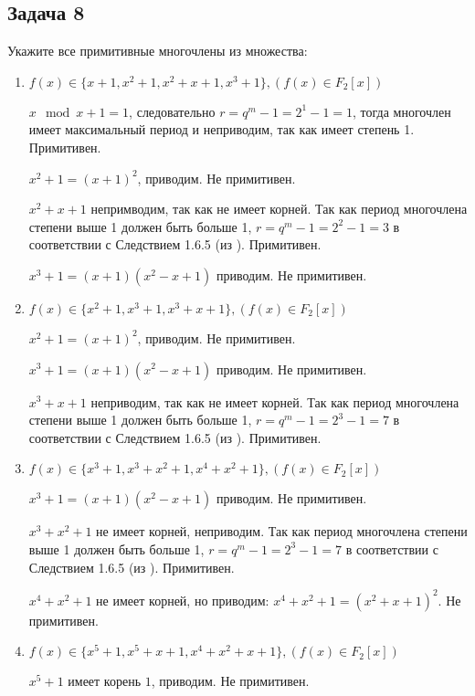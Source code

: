 \documentclass[utf8x, 14pt]{G7-32} %
\begin{document}
\subsection{Задача 8}
Укажите все примитивные многочлены из множества:


\begin{enumerate}
    \item $f(x)\in\{x+1, x^2+1, x^2+x+1, x^3+1\}, (f(x)\in F_2[x])$
    
    $x \mod x+1 = 1$, следовательно $ r = q^m -1 = 2^1 -1= 1 $, тогда многочлен имеет максимальный период и неприводим, так как имеет степень 1. Примитивен.
    
    $x^2 + 1 = (x+1)^2$, приводим. Не примитивен.
    
    $ x^2+x+1$ непримводим, так как не имеет корней. Так как период многочлена степени выше 1 должен быть больше 1, $r = q^m -1 = 2^2 - 1 = 3$ в соответствии с Следствием 1.6.5 (из \cite{hse:Teoria_Gener}). Примитивен.
    
    $x^3 + 1 = (x+1)(x^2 - x + 1)$ приводим. Не примитивен.

    \item $f(x)\in\{x^2+1, x^3+1, x^3+x+1\}, (f(x)\in F_2[x])$
    
    $x^2 + 1 = (x+1)^2$, приводим. Не примитивен.
    
    $x^3 + 1 = (x+1)(x^2 - x + 1)$ приводим. Не примитивен.
    
    $x^3+x+1$ неприводим, так как не имеет корней. Так как период многочлена степени выше 1 должен быть больше 1, $r = q^m -1 = 2^3 - 1 = 7$ в соответствии с Следствием 1.6.5 (из \cite{hse:Teoria_Gener}). Примитивен.

    \item $f(x)\in\{x^3+1, x^3+x^2+1, x^4+x^2+1\}, (f(x)\in F_2[x])$
    
    $x^3 + 1 = (x+1)(x^2 - x + 1)$ приводим. Не примитивен.
    
    $x^3+x^2+1$ не имеет корней, неприводим. Так как период многочлена степени выше 1 должен быть больше 1, $r = q^m -1 = 2^3 - 1 = 7$ в соответствии с Следствием 1.6.5 (из \cite{hse:Teoria_Gener}). Примитивен.
    
    $ x^4+x^2+1$ не имеет корней, но приводим: $ x^4+x^2+1 = (x^2+x+1)^2$. Не примитивен.

    \item $f(x)\in\{x^5+1, x^5+x+1, x^4+x^2+x+1\}, (f(x)\in F_2[x])$
    
    $x^5+1$ имеет корень $1$, приводим. Не примитивен.
    

\end{enumerate}
\end{document}
